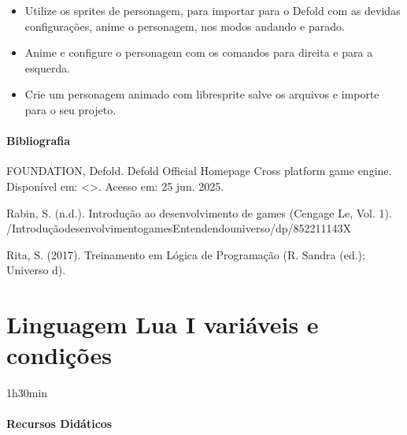 \documentclass[letterpaper,10pt,brazil]{sphinxmanual}
\begin{document}
\sphinxAtStartPar
{}
\begin{itemize}
\item {} 
 \textendash{} Utilize os sprites de personagem, para importar para o Defold com as devidas configurações, anime o personagem, nos modos andando e parado.

\item {} 
 \textendash{} Anime e configure o personagem com os comandos para direita e para a esquerda.

\item {} 
 \textendash{} Crie um personagem animado com libresprite salve os arquivos e importe para o seu projeto.

\end{itemize}

\newpage
\subsubsection*{Bibliografia}

\sphinxAtStartPar
FOUNDATION, Defold. Defold \sphinxhyphen{} Official Homepage \sphinxhyphen{} Cross platform game engine.
Disponível em: \textless{}\textgreater{}. Acesso em: 25 jun. 2025.

\sphinxAtStartPar
Rabin, S. (n.d.). Introdução ao desenvolvimento de games (Cengage Le, Vol. 1).
/Introdução\sphinxhyphen{}desenvolvimento\sphinxhyphen{}games\sphinxhyphen{}Entendendo\sphinxhyphen{}universo/dp/852211143X

\sphinxAtStartPar
Rita, S. (2017). Treinamento em Lógica de Programação (R. Sandra (ed.); Universo d).

\sphinxstepscope


\chapter{Linguagem Lua I \sphinxhyphen{} variáveis e condições}
\label{\detokenize{modelo_aula_03:linguagem-lua-i-variaveis-e-condicoes}}\label{\detokenize{modelo_aula_03::doc}}
\sphinxAtStartPar
{} 1h30min
\subsubsection*{Recursos Didáticos}
\end{document}
